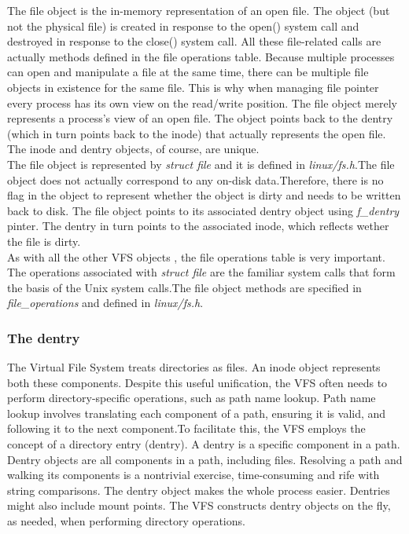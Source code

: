 \documentclass[conference]{IEEEtran}
\begin{document}
The file object is the in-memory representation of an open file. The object (but not the physical file)
is created in response to the open() system call and destroyed in response to the close() system call. 
All these file-related calls are actually methods defined in the file operations table. Because multiple 
processes can open and manipulate a file at the same time, there can be multiple file objects in existence
for the same file. This is why when managing file pointer every process has its own view on the read/write
position. The file object merely represents a process's view of an open file. 
The object points back to the dentry (which in turn points back to the inode) that actually represents the
open file. The inode and dentry objects, of course, are unique.\\

The file object is represented by {\em struct file} and it is defined in {\em linux/fs.h}.The file object does not
actually correspond to any on-disk data.Therefore, there is no flag in the object to represent whether the 
object is dirty and needs to be written back to disk. The file object points to its associated dentry object using
{\em f\_dentry} pinter. The dentry in turn points to the associated inode, which reflects wether the file is dirty.\\
As with all the other VFS objects , the file operations table is very important. The operations associated 
with {\em struct file} are the familiar system calls that form the basis of the Unix system calls.The file object
methods are specified in {\em file\_operations} and defined in {\em linux/fs.h}. \\

\subsubsection{The dentry}
The Virtual File System treats directories as files. An inode object represents both these components. 
Despite this useful unification, the VFS often needs to perform directory-specific operations, such as path 
name lookup. Path name lookup involves translating each component of a path, ensuring it is valid, and following 
it to the next component.To facilitate this, the VFS employs the concept of a directory entry (dentry). 
A dentry is a specific component in a path. Dentry objects are all components in a path, including files. 
Resolving a path and walking its components is a nontrivial exercise, time-consuming and rife with string 
comparisons. The dentry object makes the whole process easier.
Dentries might also include mount points. The VFS constructs dentry objects on the fly, as needed, 
when performing directory operations.\\
\end{document}
